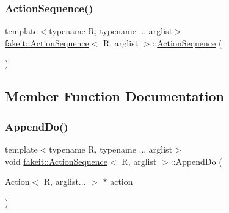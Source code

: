\mbox{\label{structfakeit_1_1ActionSequence_a2c9b1deefcce41af21f9ad4b7b431c7d}} 
\subsubsection{\texorpdfstring{ActionSequence()}{ActionSequence()}\hspace{0.1cm}{\footnotesize\ttfamily [9/9]}}
{\footnotesize\ttfamily template$<$typename R, typename ... arglist$>$ \\
\mbox{\hyperlink{structfakeit_1_1ActionSequence}{fakeit\+::\+Action\+Sequence}}$<$ R, arglist $>$\+::\mbox{\hyperlink{structfakeit_1_1ActionSequence}{Action\+Sequence}} (\begin{DoxyParamCaption}{ }\end{DoxyParamCaption})\hspace{0.3cm}{\ttfamily [inline]}}



\subsection{Member Function Documentation}
\mbox{\label{structfakeit_1_1ActionSequence_a1c5ad761d28d11e6886db563e5cb39f6}} 
\subsubsection{\texorpdfstring{AppendDo()}{AppendDo()}\hspace{0.1cm}{\footnotesize\ttfamily [1/9]}}
{\footnotesize\ttfamily template$<$typename R, typename ... arglist$>$ \\
void \mbox{\hyperlink{structfakeit_1_1ActionSequence}{fakeit\+::\+Action\+Sequence}}$<$ R, arglist $>$\+::Append\+Do (\begin{DoxyParamCaption}\item[{\mbox{\hyperlink{structfakeit_1_1Action}{Action}}$<$ R, arglist... $>$ $\ast$}]{action }\end{DoxyParamCaption})\hspace{0.3cm}{\ttfamily [inline]}}

